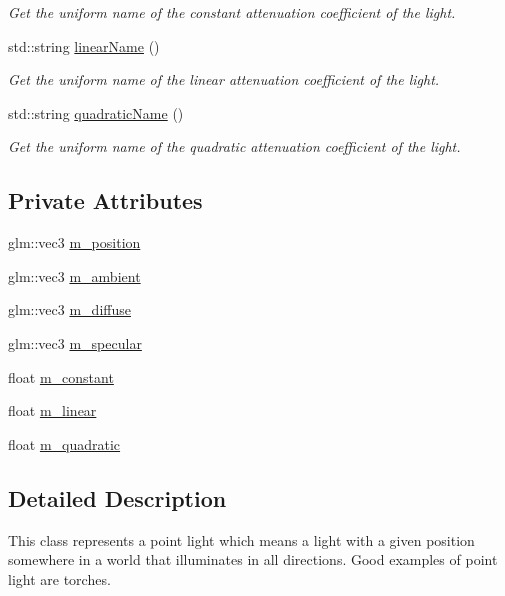 \begin{DoxyCompactItemize}
\begin{DoxyCompactList}\small\item\em Get the uniform name of the constant attenuation coefficient of the light. \end{DoxyCompactList}\item 
std\+::string \hyperlink{classPointLight_a505d362ac12ed47b169aced70f646bd4}{linear\+Name} ()
\begin{DoxyCompactList}\small\item\em Get the uniform name of the linear attenuation coefficient of the light. \end{DoxyCompactList}\item 
std\+::string \hyperlink{classPointLight_a86032735679d386e6c3d94540767adab}{quadratic\+Name} ()
\begin{DoxyCompactList}\small\item\em Get the uniform name of the quadratic attenuation coefficient of the light. \end{DoxyCompactList}\end{DoxyCompactItemize}
\subsection*{Private Attributes}
\begin{DoxyCompactItemize}
\item 
glm\+::vec3 \hyperlink{classPointLight_a58baecb4dd64a4dc3ea59628f55cbac4}{m\+\_\+position}
\item 
glm\+::vec3 \hyperlink{classPointLight_a24fea5d1cc566b9a5266e3fc2df56f22}{m\+\_\+ambient}
\item 
glm\+::vec3 \hyperlink{classPointLight_a3e055011470b6dc9000f57fde449b8e2}{m\+\_\+diffuse}
\item 
glm\+::vec3 \hyperlink{classPointLight_a07a85987190c6c415b93437554f1f0f1}{m\+\_\+specular}
\item 
float \hyperlink{classPointLight_a404f6e39448eaa92dbdbec6183062147}{m\+\_\+constant}
\item 
float \hyperlink{classPointLight_aaaf19c31763c3614e3edcd1eef322e96}{m\+\_\+linear}
\item 
float \hyperlink{classPointLight_a4cc1b2791d8e3ca503060f6f1f38f774}{m\+\_\+quadratic}
\end{DoxyCompactItemize}


\subsection{Detailed Description}
This class represents a point light which means a light with a given position somewhere in a world that illuminates in all directions. Good examples of point light are torches. 

